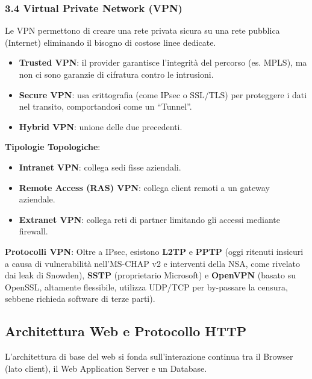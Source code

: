 \documentclass{article}
\begin{document}
\subsubsection{3.4 Virtual Private Network (VPN)}
Le VPN permettono di creare una rete privata sicura su una rete pubblica (Internet) eliminando il bisogno di costose linee dedicate.
\begin{itemize}
    \item \textbf{Trusted VPN}: il provider garantisce l'integrità del percorso (es. MPLS), ma non ci sono garanzie di cifratura contro le intrusioni.
    \item \textbf{Secure VPN}: usa crittografia (come IPsec o SSL/TLS) per proteggere i dati nel transito, comportandosi come un ``Tunnel''.
    \item \textbf{Hybrid VPN}: unione delle due precedenti.
\end{itemize}

\textbf{Tipologie Topologiche}:
\begin{itemize}
    \item \textbf{Intranet VPN}: collega sedi fisse aziendali.
    \item \textbf{Remote Access (RAS) VPN}: collega client remoti a un gateway aziendale.
    \item \textbf{Extranet VPN}: collega reti di partner limitando gli accessi mediante firewall.
\end{itemize}

\textbf{Protocolli VPN}:
Oltre a IPsec, esistono \textbf{L2TP} e \textbf{PPTP} (oggi ritenuti insicuri a causa di vulnerabilità nell'MS-CHAP v2 e interventi della NSA, come rivelato dai leak di Snowden), \textbf{SSTP} (proprietario Microsoft) e \textbf{OpenVPN} (basato su OpenSSL, altamente flessibile, utilizza UDP/TCP per by-passare la censura, sebbene richieda software di terze parti).


\subsection{Architettura Web e Protocollo HTTP}
L'architettura di base del web si fonda sull'interazione continua tra il Browser (lato client), il Web Application Server e un Database.
\end{document}
